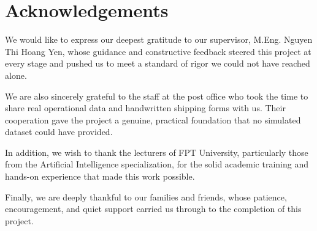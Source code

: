 \chapter*{Acknowledgements}

We would like to express our deepest gratitude to our supervisor, M.Eng. Nguyen Thi Hoang Yen, whose guidance and constructive feedback steered this project at every stage and pushed us to meet a standard of rigor we could not have reached alone.

We are also sincerely grateful to the staff at the post office who took the time to share real operational data and handwritten shipping forms with us. Their cooperation gave the project a genuine, practical foundation that no simulated dataset could have provided.

In addition, we wish to thank the lecturers of FPT University, particularly those from the Artificial Intelligence specialization, for the solid academic training and hands-on experience that made this work possible.

Finally, we are deeply thankful to our families and friends, whose patience, encouragement, and quiet support carried us through to the completion of this project.

